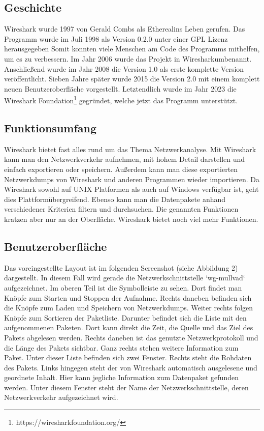 \documentclass[12pt]{article}
\begin{document}
\subsection{Geschichte}
Wireshark wurde 1997 von Gerald Combs als \glq Ethereal\grq ins Leben gerufen. Das Programm wurde im Juli 1998 als Version 0.2.0 unter einer GPL Lizenz\cite{gnu-gpl} herausgegeben \cite{gnu-wireshark} Somit konnten viele Menschen am Code des Programms mithelfen, um es zu verbessern. Im Jahr 2006 wurde das Projekt in \glq Wireshark\grq umbenannt. Anschließend wurde  im Jahr 2008 die Version 1.0 als erste komplette Version veröffentlicht. Sieben Jahre später wurde 2015 die Version 2.0 mit einem komplett neuen Benutzeroberfläche vorgestellt. Letztendlich wurde im Jahr 2023 die Wireshark Foundation\footnote{https://wiresharkfoundation.org/} gegründet, welche jetzt das Programm unterstützt. \cite{wireshark-history}

\subsection{Funktionsumfang}

Wireshark bietet fast alles rund um das Thema Netzwerkanalyse. Mit Wireshark kann man den Netzwerkverkehr aufnehmen, mit hohem Detail darstellen und einfach exportieren oder speichern. Außerdem kann man diese exportierten Netzwerkdumps von Wireshark und anderen Programmen wieder importieren. Da Wireshark sowohl auf UNIX Platformen als auch auf Windows verfügbar ist, geht dies Plattformübergreifend. Ebenso kann man die Datenpakete anhand verschiedener Kriterien filtern und durchsuchen. Die genannten Funktionen kratzen aber nur an der Oberfläche. Wireshark bietet noch viel mehr Funktionen.\cite{features}

\subsection{Benutzeroberfläche}

Das voreingestellte Layout ist im folgenden Screenshot (siehe Abbildung 2) dargestellt. In diesem Fall wird gerade die Netzwerkschnittstelle `wg-mullvad` aufgezeichnet. Im oberen Teil ist die Symbolleiste zu sehen. Dort findet man Knöpfe zum Starten und Stoppen der Aufnahme.  Rechts daneben befinden sich die Knöpfe zum Laden und Speichern von Netzwerkdumps. Weiter rechts folgen Knöpfe zum Sortieren der Paketliste. Darunter befindet sich die Liste mit den aufgenommenen Paketen. Dort kann direkt die Zeit, die Quelle und das Ziel des Pakets abgelesen werden. Rechts daneben ist das genutzte Netzwerkprotokoll und die Länge des Pakets sichtbar. Ganz rechts stehen weitere Information zum Paket. Unter dieser Liste befinden sich zwei Fenster. Rechts steht die Rohdaten des Pakets. Links hingegen steht der von Wireshark automatisch ausgelesene und geordnete Inhalt. Hier kann jegliche Information zum Datenpaket gefunden werden. Unter diesem Fenster steht der Name der Netzwerkschnittstelle, deren Netzwerkverkehr aufgezeichnet wird.
\end{document}
